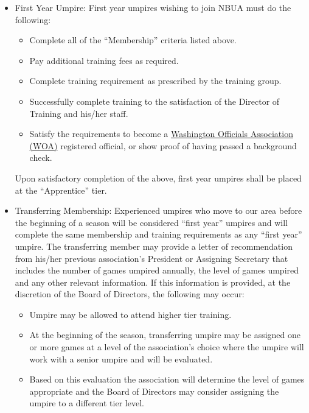 \documentclass[letterpaper,11pt,colorlinks=true,allcolors=blue]{article}
\begin{document}
\begin{itemize}
\item First Year Umpire: First year umpires wishing to join NBUA must do the following:
\begin{itemize}
\item Complete all of the “Membership” criteria listed above.
\item Pay additional training fees as required.
\item Complete training requirement as prescribed by the training group.
\item Successfully complete training to the satisfaction of the Director of Training and his/her staff.
\item Satisfy the requirements to become a \href{https://woa.arbitersports.com/front/104759/Site}{Washington Officials Association (WOA)} registered official, or show proof of having passed a background check.
\end{itemize}
Upon satisfactory completion of the above, first year umpires shall be placed at the “Apprentice” tier. 

\item Transferring Membership: Experienced umpires who move to our area before the beginning of a season will be considered “first year” umpires and will complete the same membership and training requirements as any “first year” umpire. The transferring member may provide a letter of recommendation from his/her previous association's President or Assigning Secretary that includes the number of games umpired annually, the level of games umpired and any other relevant information. If this information is provided, at the discretion of the Board of Directors, the following may occur:

\begin{itemize}
\item Umpire may be allowed to attend higher tier training.
\item At the beginning of the season, transferring umpire may be assigned one or more games at a level of the association’s choice where the umpire will work with a senior umpire and will be evaluated.
\item Based on this evaluation the association will determine the level of games appropriate and the Board of Directors may consider assigning the umpire to a different tier level.
\end{itemize}


\end{itemize}
\end{document}
